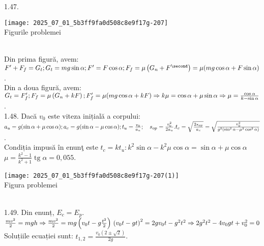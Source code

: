 1.47. \begin{center} \texttt{[image: 2025\_07\_01\_5b3ff9fa0d508c8e9f17g-207]}\\ Figurile problemei \end{center}\\ Din prima figură, avem:\\ $F^{\prime}+F_{f}=G_{t};\\ G_{t}=m g \sin \alpha;\\ F^{\prime}=F \cos \alpha;\\ F_{f}=\mu\left(G_{n}+F^{\second}\right)=\mu(m g \cos \alpha+F \sin \alpha)$.\\ Din a doua figură, avem:\\ $G_{t}=F_{f}^{\prime};\\ F_{f}=\mu\left(G_{n}+k F\right);\\ F_{f}^{\prime}=\mu(m g \cos \alpha+k F) \Rightarrow k \mu=\cos \alpha+\mu \sin \alpha \Rightarrow \mu=\frac{\cos \alpha}{k-\sin \alpha}$.\\

1.48. Dacă $v_{0}$ este viteza inițială a corpului:\\ $a_{u}=g(\sin \alpha+\mu \cos \alpha);\\ a_{c}=g(\sin \alpha-\mu \cos \alpha);\\ t_{u}=\frac{v_{0}}{a_{u}}; \quad s_{o p}=\frac{v_{0}^{2}}{2 a_{u}}.\\ t_{c}=\sqrt{\frac{2 s_{o p}}{a_{c}}}=\sqrt{\frac{v_{0}^{2}}{g^{2}\left(\sin ^{2} \alpha-\mu^{2} \cos ^{2} \alpha\right)}}$.\\ Condiția impusă în enunţ este $t_{c}=k t_{u}: k^{2} \sin \alpha-k^{2} \mu \cos \alpha=\sin \alpha+\mu \cos \alpha$\\ $\mu=\frac{k^{2}-1}{k^{2}+1} \operatorname{tg} \alpha=0,055$.\\ \begin{center} \texttt{[image: 2025\_07\_01\_5b3ff9fa0d508c8e9f17g-207(1)]}\\ Figura problemei \end{center}\\

1.49. Din enunț, $E_{c}=E_{p}$.\\ $\frac{m v^{2}}{2}=m g h \Rightarrow \frac{m v^{2}}{2}=m g\left(v_{0} t-g \frac{t^{2}}{2}\right)\\ \left(v_{0} t-g t\right)^{2}=2 g v_{0} t-g^{2} t^{2} \Rightarrow 2 g^{2} t^{2}-4 v_{0} g t+v_{0}^{2}=0$\\ Soluțiile ecuației sunt: $t_{1,2}=\frac{v_{0}(2 \pm \sqrt{2})}{2 g}$.\\

